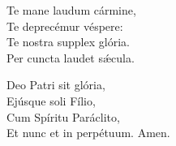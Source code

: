  Te mane laudum cármine,\\
 Te deprecémur véspere:\\
 Te nostra supplex glória.\\
 Per cun\-cta laudet sǽcula.

Deo Patri sit glória,\\
Ejúsque soli Fílio,\\
Cum Spíritu Paráclito,\\
Et nunc et in perpétuum. Amen. 